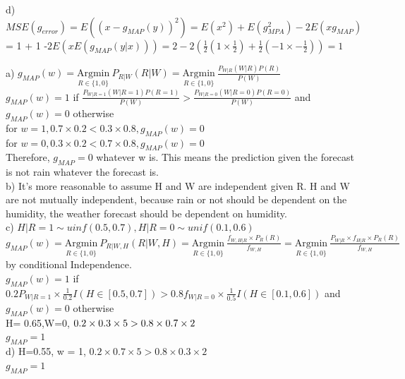 \documentclass[11pt]{article}
\newenvironment{problem}[2][Problem]{\begin{trivlist}
\item[\hskip \labelsep {\bfseries #1}\hskip \labelsep {\bfseries #2.}]}{\end{trivlist}}
\begin{document}
 d)$MSE(g_{error}) = E((x - g_{MAP}(y))^2) = E(x^2) + E(g_{MPA}^2) -2E(xg_{MAP})$\\
 = 1 + 1 -$2E(xE(g_{MAP}(y|x))) = 2 - 2(\frac{1}{2}(1\times \frac{1}{2})+\frac{1}{2}(-1\times -\frac{1}{2})) = 1$ 
 
  
 
 \begin{problem}{2}
 \end{problem}
a) $g_{MAP}(w) =\underset{R \in \{1, 0\}} {\mathrm{Argmin}} ~ P_{R|W}(R|W)  = \underset{R \in \{1, 0\}} {\mathrm{Argmin}} ~ \frac{P_{W|R}(W|R)P(R)}{P(W)}$\\
$g_{MAP}(w)  = 1 $ if $ \frac{P_{W|R=1}(W|R=1)P(R=1)}{P(W)}>\frac{P_{W|R=0}(W|R=0)P(R=0)}{P(W)}$ and $g_{MAP}(w)  = 0$ otherwise\\
for $w =1, 0.7\times 0.2 < 0.3\times 0.8, g_{MAP}(w)  = 0$ \\
for $w =0, 0.3\times 0.2 < 0.7\times 0.8, g_{MAP}(w)  = 0$ \\
Therefore, $g_{MAP} = 0$ whatever w is. This means the prediction given the forecast is not rain whatever the forecast is.\\

b) It's more reasonable to assume H and W are independent given R. H and W are not mutually independent, because rain or not should be dependent on the humidity, the weather forecast should be dependent on humidity. \\

c)  $H|R=1 \sim uinf(0.5,0.7), H|R=0 \sim unif(0.1,0.6)$\\
$g_{MAP}(w) =\underset{R \in \{1, 0\}} {\mathrm{Argmin}} ~ P_{R|W,H}(R|W,H)  = \underset{R \in \{1, 0\}} {\mathrm{Argmin}} ~\frac{f_{W,H|R}\times P_R(R)}{f_{W,H}}=\underset{R \in \{1, 0\}} {\mathrm{Argmin}} ~\frac{P_{W|R}\times f_{H|R}\times P_R(R)}{f_{W,H}} $ \\by conditional Independence.\\
$g_{MAP}(w)  = 1 $ if $ 0.2 P_{W|R=1} \times \frac{1}{0.2} I(H\in[0.5,0.7]) >0.8f_{W|R=0} \times \frac{1}{0.5}I(H \in [0.1,0.6])$ and $g_{MAP}(w)  = 0$ otherwise\\

H= 0.65,W=0,  \quad $0.2 \times 0.3\times 5 > 0.8 \times0.7\times 2\time 0$\\
$g_{MAP} =1$\\

d) H=0.55, w = 1, \quad $0.2\times  0.7 \times 5 > 0.8\times 0.3 \times 2$\\
$g_{MAP} =1$\\
\end{document}
